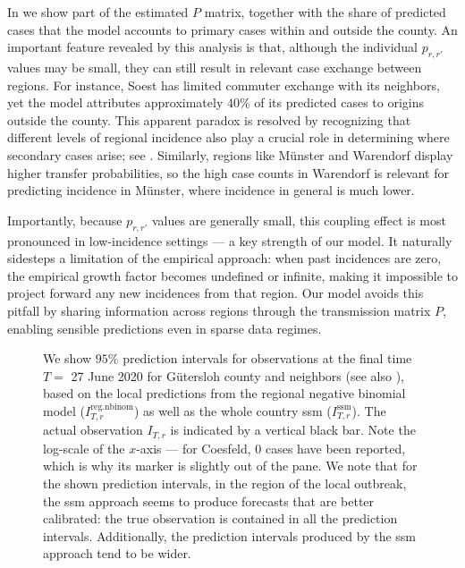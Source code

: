 In  we show part of the estimated $P$ matrix, together with the share of predicted cases that the model accounts to primary cases within and outside the county. An important feature revealed by this analysis is that, although the individual $p_{r,r'}$ values may be small, they can still result in relevant case exchange between regions. For instance, Soest has limited commuter exchange with its neighbors, yet the model attributes approximately $40\%$ of its predicted cases to origins outside the county. This apparent paradox is resolved by recognizing that different levels of regional incidence also play a crucial role in determining where secondary cases arise; see . Similarly, regions like Münster and Warendorf display higher transfer probabilities, so the high case counts in Warendorf is relevant for predicting incidence in Münster, where incidence in general is much lower. 

Importantly, because $p_{r,r'}$ values are generally small, this coupling effect is most pronounced in low-incidence settings --- a key strength of our model. It naturally sidesteps a limitation of the empirical approach: when past incidences are zero, the empirical growth factor becomes undefined or infinite, making it impossible to project forward any new incidences from that region. Our model avoids this pitfall by sharing information across regions through the transmission matrix $P$, enabling sensible predictions even in sparse data regimes.

%
%

\begin{figure}
    \resizebox{\textwidth}{!}{%
    }
    \caption{We show $95\%$ prediction intervals for observations at the final time $T =$ 27 June 2020 for Gütersloh county and neighbors (see also ), based on the local predictions from the regional negative binomial model ($I^{\text{reg.nbinom}}_{T,r}$) as well as the whole country \gls{ssm} ($I^{\text{ssm}}_{T,r}$). The actual observation $I_{T,r}$ is indicated by a vertical black bar. Note the log-scale of the $x$-axis --- for Coesfeld, $0$ cases have been reported, which is why its marker is slightly out of the pane. We note that for the shown prediction intervals, in the region of the local outbreak, the \gls{ssm} approach seems to produce forecasts that are better calibrated: the true observation is contained in all the prediction intervals. Additionally, the prediction intervals produced by the \gls{ssm} approach tend to be wider.} 
    \label{fig:regional_predictions_GL}
\end{figure}

